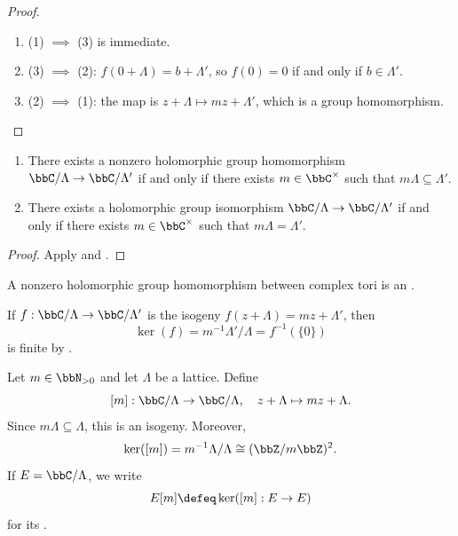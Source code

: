 \begin{proof}
    \leavevmode
    \begin{enumerate}[label=(\arabic*)]
        \item (1) $\implies$ (3) is immediate.
        \item (3) $\implies$ (2): $f(0 + \Lambda) = b + \Lambda'$, so $f(0) = 0$ if and only if $b \in \Lambda'$.
        \item (2) $\implies$ (1): the map is $z + \Lambda \mapsto mz + \Lambda'$, which is a group homomorphism.
    \end{enumerate}
\end{proof}

\begin{corollary}\label{Cor:MF_torus_isogeny}
    \leavevmode
    \begin{enumerate}[label=(\arabic*)]
        \item There exists a nonzero holomorphic group homomorphism $\bbC/\Lambda \to \bbC/\Lambda'$ if and only if there exists $m \in \bbC^\times$ such that $m\Lambda \subseteq \Lambda'$.
        \item There exists a holomorphic group isomorphism $\bbC/\Lambda \to \bbC/\Lambda'$ if and only if there exists $m \in \bbC^\times$ such that $m\Lambda = \Lambda'$.
    \end{enumerate}
\end{corollary}

\begin{proof}
    Apply  and .
\end{proof}

\begin{definition}\label{Def:MF_isogeny}
    A nonzero holomorphic group homomorphism between complex tori is an .
\end{definition}

\begin{remark}
    If $f : \bbC/\Lambda \to \bbC/\Lambda'$ is the isogeny $f(z + \Lambda) = mz + \Lambda'$, then
    \[
        \ker(f) = m^{-1}\Lambda'/\Lambda = f^{-1}(\{0\})
    \]
    is finite by .
\end{remark}

\begin{example}\label{Ex:MF_multiplication}
    Let $m \in \bbN_{>0}$ and let $\Lambda$ be a lattice. Define
    \[
        [m] : \bbC/\Lambda \to \bbC/\Lambda, \quad z + \Lambda \mapsto mz + \Lambda.
    \]
    Since $m\Lambda \subseteq \Lambda$, this is an isogeny. Moreover,
    \[
        \ker([m]) = m^{-1}\Lambda/\Lambda \cong (\bbZ/m\bbZ)^2.
    \]
    If $E = \bbC/\Lambda$, we write
    \[
        E[m] \defeq \ker([m] : E \to E)
    \]
    for its .
\end{example}

